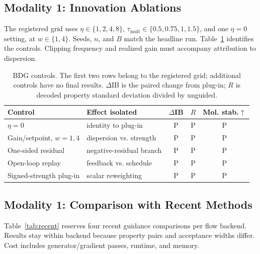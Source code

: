 \documentclass{article}
\newcommand{\pend}{\textcolor{black!60}{\textsf{P}}}
\begin{document}
\subsection{Modality 1: Innovation Ablations}\label{sec:ablations}
The registered grid uses $\eta\in\{1,2,4,8\}$, $\tau_{\mathrm{mult}}\in\{0.5,0.75,1,1.5\}$, and one $\eta=0$ setting, at $w\in\{1,4\}$. Seeds, $n$, and $B$ match the headline run. Table~\ref{tab:ablation} identifies the controls. Clipping frequency and realized gain must accompany attribution to dispersion.

\begin{table}[!htbp]
\centering\small
\caption{BDG controls. The first two rows belong to the registered grid; additional controls have no final results. $\Delta$IB is the paired change from plug-in; $R$ is decoded property standard deviation divided by unguided.}
\label{tab:ablation}
\begin{tabular}{llccc}
\toprule
Control & Effect isolated & $\Delta$IB & $R$ & Mol. stab.$\uparrow$\\
\midrule
$\eta=0$ & identity to plug-in & \pend & \pend & \pend\\
Gain/setpoint, $w=1,4$ & dispersion vs. strength & \pend & \pend & \pend\\
One-sided residual & negative-residual branch & \pend & \pend & \pend\\
Open-loop replay & feedback vs. schedule & \pend & \pend & \pend\\
Signed-strength plug-in & scalar reweighting & \pend & \pend & \pend\\
\bottomrule
\end{tabular}
\end{table}


\subsection{Modality 1: Comparison with Recent Methods}\label{sec:recent}
Table~\ref{tab:recent} reserves four recent guidance comparisons per flow backend. Results stay within backend because property pairs and acceptance widths differ. Cost includes generator/gradient passes, runtime, and memory.
\end{document}
